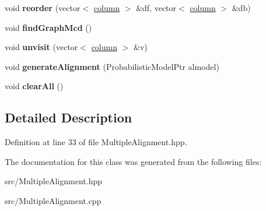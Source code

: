 \begin{DoxyCompactItemize}
void {\bfseries reorder} (vector$<$ \hyperlink{structtops_1_1column}{column} $>$ \&df, vector$<$ \hyperlink{structtops_1_1column}{column} $>$ \&db)
\item 
\mbox{\label{classtops_1_1MultipleAlignment_ae50f05b816006f15bb524a94cf01486b}} 
void {\bfseries find\+Graph\+Mcd} ()
\item 
\mbox{\label{classtops_1_1MultipleAlignment_abb75c55b3d889cb6257ff087957c10bb}} 
void {\bfseries unvisit} (vector$<$ \hyperlink{structtops_1_1column}{column} $>$ \&v)
\item 
\mbox{\label{classtops_1_1MultipleAlignment_aa03167eea7c9aa5290ad92ccd887c822}} 
void {\bfseries generate\+Alignment} (Probabilistic\+Model\+Ptr almodel)
\item 
\mbox{\label{classtops_1_1MultipleAlignment_af8bd2868b2400d7f68afe4bf97f60438}} 
void {\bfseries clear\+All} ()
\end{DoxyCompactItemize}


\subsection{Detailed Description}


Definition at line 33 of file Multiple\+Alignment.\+hpp.



The documentation for this class was generated from the following files\+:\begin{DoxyCompactItemize}
\item 
src/Multiple\+Alignment.\+hpp\item 
src/Multiple\+Alignment.\+cpp\end{DoxyCompactItemize}
